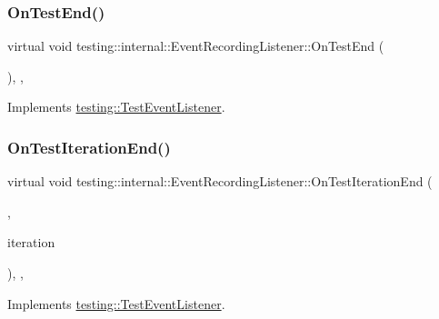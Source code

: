 \subsubsection{\texorpdfstring{OnTestEnd()}{OnTestEnd()}}
{\footnotesize\ttfamily virtual void testing\+::internal\+::\+Event\+Recording\+Listener\+::\+On\+Test\+End (\begin{DoxyParamCaption}\item[{const \mbox{\hyperlink{classtesting_1_1TestInfo}{Test\+Info}} \&}]{ }\end{DoxyParamCaption})\hspace{0.3cm}{\ttfamily [inline]}, {\ttfamily [protected]}, {\ttfamily [virtual]}}



Implements \mbox{\hyperlink{classtesting_1_1TestEventListener_abb1c44525ef038500608b5dc2f17099b}{testing\+::\+Test\+Event\+Listener}}.

\mbox{\label{classtesting_1_1internal_1_1EventRecordingListener_ab0cc007bcfaf06cd383d574c88f62aea}} 
\subsubsection{\texorpdfstring{OnTestIterationEnd()}{OnTestIterationEnd()}}
{\footnotesize\ttfamily virtual void testing\+::internal\+::\+Event\+Recording\+Listener\+::\+On\+Test\+Iteration\+End (\begin{DoxyParamCaption}\item[{const \mbox{\hyperlink{classtesting_1_1UnitTest}{Unit\+Test}} \&}]{,  }\item[{int}]{iteration }\end{DoxyParamCaption})\hspace{0.3cm}{\ttfamily [inline]}, {\ttfamily [protected]}, {\ttfamily [virtual]}}



Implements \mbox{\hyperlink{classtesting_1_1TestEventListener_a550fdb3e55726e4cefa09f5697941425}{testing\+::\+Test\+Event\+Listener}}.

\mbox{\label{classtesting_1_1internal_1_1EventRecordingListener_a0bfa276def9594b2a119c2c370f59281}} 
